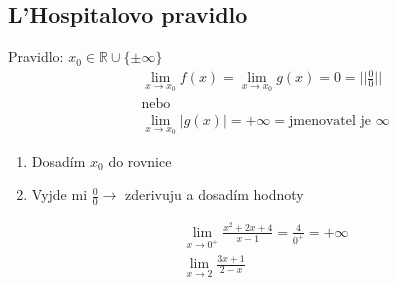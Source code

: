 \subsection{L'Hospitalovo pravidlo}
\begin{center}
  Pravidlo: $x_0\in\mathbb{R}\cup\{\pm\infty\}$
  \begin{align*}
    &\lim_{x \to x_0}f(x)=\lim_{x \to x_0}g(x)=0=||\frac{0}{0}|| \\
    &\text{nebo}\\
    &\lim_{x \to x_0}|g(x)|=+\infty=\text{jmenovatel je $\infty$}
  \end{align*}
  \begin{enumerate}
    \item Dosadím $x_0$ do rovnice
    \item Vyjde mi $\frac{0}{0}\rightarrow$ zderivuju a dosadím hodnoty
  \end{enumerate}
  \begin{eqnarray*}
    &\lim_{x \to 0^+}\frac{x^2+2x+4}{x-1}=\frac{4}{0^+}=+\infty\\
    &\lim_{x \to 2}\frac{3x+1}{2-x}
  \end{eqnarray*}
\end{center}

